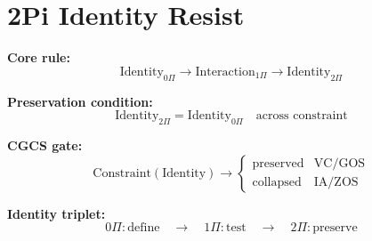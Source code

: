 \section*{2Pi Identity Resist}

\textbf{Core rule:}
\[
\mathrm{Identity}_{0\Pi}
\rightarrow
\mathrm{Interaction}_{1\Pi}
\rightarrow
\mathrm{Identity}_{2\Pi}
\]

\textbf{Preservation condition:}
\[
\mathrm{Identity}_{2\Pi} = \mathrm{Identity}_{0\Pi}
\quad \text{across constraint}
\]

\textbf{CGCS gate:}
\[
\mathrm{Constraint}(\mathrm{Identity}) \rightarrow
\begin{cases}
\mathrm{preserved} & \text{VC/GOS} \\
\mathrm{collapsed} & \text{IA/ZOS}
\end{cases}
\]

\textbf{Identity triplet:}
\[
0\Pi:\mathrm{define}
\quad\rightarrow\quad
1\Pi:\mathrm{test}
\quad\rightarrow\quad
2\Pi:\mathrm{preserve}
\]
